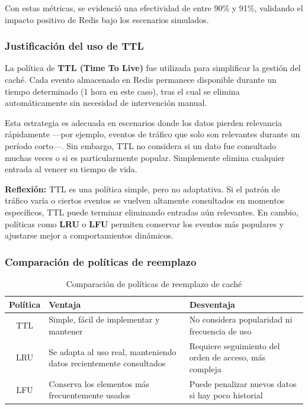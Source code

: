 \documentclass[12pt]{article}
\begin{document}
Con estas métricas, se evidenció una efectividad de entre 90\% y 91\%, validando el impacto positivo de Redis bajo los escenarios simulados.

\subsubsection*{Justificación del uso de TTL}

La política de \textbf{TTL (Time To Live)} fue utilizada para simplificar la gestión del caché. Cada evento almacenado en Redis permanece disponible durante un tiempo determinado (1 hora en este caso), tras el cual se elimina automáticamente sin necesidad de intervención manual.

Esta estrategia es adecuada en escenarios donde los datos pierden relevancia rápidamente —por ejemplo, eventos de tráfico que solo son relevantes durante un período corto—. Sin embargo, TTL no considera si un dato fue consultado muchas veces o si es particularmente popular. Simplemente elimina cualquier entrada al vencer su tiempo de vida.

\textbf{Reflexión:} TTL es una política simple, pero no adaptativa. Si el patrón de tráfico varía o ciertos eventos se vuelven altamente consultados en momentos específicos, TTL puede terminar eliminando entradas aún relevantes. En cambio, políticas como \textbf{LRU} o \textbf{LFU} permiten conservar los eventos más populares y ajustarse mejor a comportamientos dinámicos.

\subsubsection*{Comparación de políticas de reemplazo}

\begin{table}[H]
    \centering
    \begin{tabular}{|c|p{4.5cm}|p{4.5cm}|}
        \hline
        \textbf{Política} & \textbf{Ventaja} & \textbf{Desventaja} \\
        \hline
        TTL & Simple, fácil de implementar y mantener & No considera popularidad ni frecuencia de uso \\
        \hline
        LRU & Se adapta al uso real, manteniendo datos recientemente consultados & Requiere seguimiento del orden de acceso, más compleja \\
        \hline
        LFU & Conserva los elementos más frecuentemente usados & Puede penalizar nuevos datos si hay poco historial \\
        \hline
    \end{tabular}
    \caption{Comparación de políticas de reemplazo de caché}
\end{table}
\end{document}
